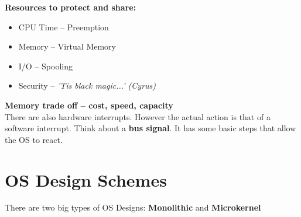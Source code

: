 \documentclass[../base_file/cs1550_notes.tex]{subfiles}
\begin{document}
\textbf{Resources to protect and share:}
	\begin{itemize}
	\item CPU Time -- Preemption
	\item Memory -- Virtual Memory
	\item I/O -- Spooling
	\item Security -- \textit{'Tis black magic...' (Cyrus)}
	\end{itemize}
\textbf{Memory trade off -- cost, speed, capacity}\\

There are also hardware interrupts.  However the actual action is that of a software interrupt.  Think
about a \textbf{bus signal}.  It has some basic steps that allow the OS to react.

\section{OS Design Schemes}
There are two big types of OS Designs: \textbf{Monolithic} and \textbf{Microkernel}
\end{document}
